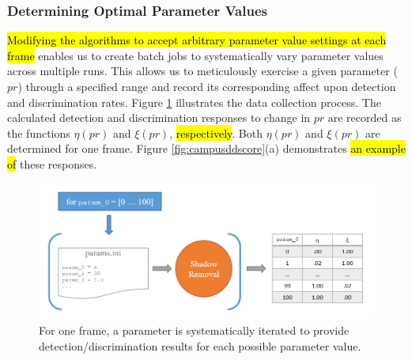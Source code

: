 \subsubsection{Determining Optimal Parameter Values}

\hl{Modifying the algorithms to accept arbitrary parameter value settings at each frame} enables us to create batch jobs to systematically vary parameter values across multiple runs. This allows us to meticulously exercise a given parameter ($pr$) through a specified range and record its corresponding affect upon detection and discrimination rates. Figure \ref{fig:guiiterate} illustrates the data collection process. The calculated detection and discrimination responses to change in $pr$ are recorded as the functions $\eta(pr)$ and $\xi(pr)$, \hl{respectively}. Both $\eta(pr)$ and $\xi(pr)$ are determined for one frame. Figure \ref{fig:campusddscore}(a) demonstrates \hl{an example of} these responses.

\begin{figure}
  \centering
  \includegraphics[width=1\linewidth]{figures/gui_iterate.png}
  \caption{For one frame, a parameter is systematically iterated to provide detection/discrimination results for each possible parameter value.}
  \label{fig:guiiterate}
\end{figure}

